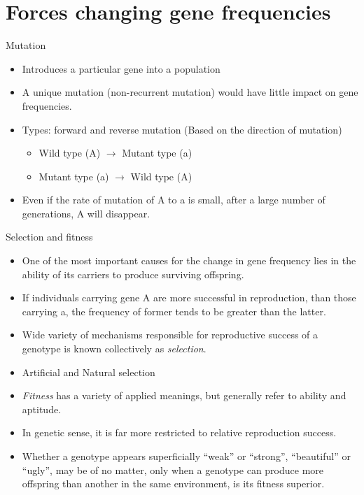 \documentclass[11pt,ignorenonframetext,aspectratio=169]{beamer}
\providecommand{\tightlist}{%
  \setlength{\itemsep}{0pt}\setlength{\parskip}{0pt}}
\begin{document}
\hypertarget{forces-changing-gene-frequencies}{%
\section{Forces changing gene
frequencies}\label{forces-changing-gene-frequencies}}

\begin{frame}{Mutation}
\protect\hypertarget{mutation}{}
\begin{itemize}
\tightlist
\item
  Introduces a particular gene into a population
\item
  A unique mutation (non-recurrent mutation) would have little impact on
  gene frequencies.
\item
  Types: forward and reverse mutation (Based on the direction of
  mutation)

  \begin{itemize}
  \tightlist
  \item
    Wild type (A) \(\rightarrow\) Mutant type (a)
  \item
    Mutant type (a) \(\rightarrow\) Wild type (A)
  \end{itemize}
\item
  Even if the rate of mutation of A to a is small, after a large number
  of generations, A will disappear.
\end{itemize}
\end{frame}

\begin{frame}{Selection and fitness}
\protect\hypertarget{selection-and-fitness}{}
\begin{itemize}
\tightlist
\item
  One of the most important causes for the change in gene frequency lies
  in the ability of its carriers to produce surviving offspring.
\item
  If individuals carrying gene A are more successful in reproduction,
  than those carrying a, the frequency of former tends to be greater
  than the latter.
\item
  Wide variety of mechanisms responsible for reproductive success of a
  genotype is known collectively as \emph{selection}.
\item
  Artificial and Natural selection
\item
  \emph{Fitness} has a variety of applied meanings, but generally refer
  to ability and aptitude.
\item
  In genetic sense, it is far more restricted to relative reproduction
  success.
\item
  Whether a genotype appears superficially ``weak'' or ``strong'',
  ``beautiful'' or ``ugly'', may be of no matter, only when a genotype
  can produce more offspring than another in the same environment, is
  its fitness superior.
\end{itemize}
\end{frame}
\end{document}
